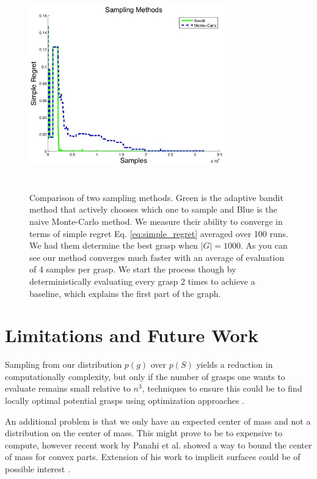 \documentclass[letterpaper, 10 pt, conference]{ieeeconf}  %
\begin{document}
\begin{figure}[ht!]
\centering
\includegraphics[width=8.5cm,height=9cm]{figures/Slide09.jpg}
\caption{ \footnotesize Comparison of two sampling methods. Green is the adaptive bandit method that actively chooses which one to sample and Blue is the naive Monte-Carlo method. We measure their ability to converge in terms of simple regret Eq. \ref{eq:simple_regret} averaged over 100 runs. We had them determine the best grasp when $|G|=1000$. As you can see our method converges much faster with an average of evaluation of 4 samples per grasp. We start the process though by deterministically evaluating every grasp 2 times to achieve a baseline, which explains the first part of the graph.}
\vspace*{-10pt}
\label{fig:simple_regret}
\end{figure}







\section{Limitations and Future Work}
Sampling from our distribution $p(g)$ over $p(S)$ yields a reduction in computationally complexity, but only if the number of grasps one wants to evaluate remains small relative to $n^3$, techniques to ensure this could be to find locally optimal potential grasps using optimization approaches \cite{jeffs}. 

An additional problem is that we only have an expected center of mass and not a distribution on the center of mass. This might prove to be to expensive to compute, however recent work by Panahi et al. showed a way to bound the center of mass for convex parts. Extension of his work to implicit surfaces could be of possible interest \cite{panahi2014bounding}.  
\end{document}
